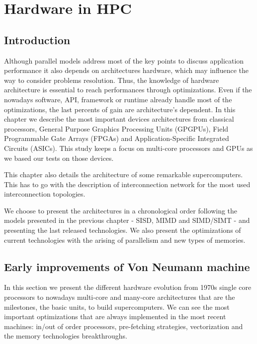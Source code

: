 
\chapter{Hardware in HPC}

\section{Introduction}

Although parallel models address most of the key points to discuss application performance it also depends on architectures hardware, which may influence the way to consider problems resolution. 
Thus, the knowledge of hardware architecture is essential to reach performances through optimizations.
Even if the nowadays software, API, framework or runtime already handle most of the optimizations, the last percents of gain are architecture's dependent. 
In this chapter we describe the most important devices architectures from classical processors, General Purpose Graphics Processing Units (GPGPUs), Field Programmable Gate Arrays (FPGAs) and Application-Specific Integrated Circuits (ASICs).
This study keeps a focus on multi-core processors and GPUs as we based our tests on those devices. 

This chapter also details the architecture of some remarkable supercomputers. 
This has to go with the description of interconnection network for the most used interconnection topologies. 

We choose to present the architectures in a chronological order following the models presented in the previous chapter - SISD, MIMD and SIMD/SIMT - and presenting the last released technologies.
We also present the optimizations of current technologies with the arising of parallelism and new types of memories.

\section{Early improvements of Von Neumann machine}
In this section we present the different hardware evolution from 1970s single core processors to nowadays multi-core and many-core architectures that are the milestones, the basic units, to build supercomputers. 
We can see the most important optimizations that are always implemented in the most recent machines: in/out of order processors, pre-fetching strategies, vectorization and the memory technologies breakthroughs. 

